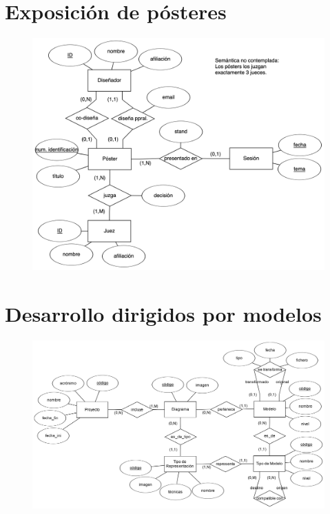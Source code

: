 \documentclass[a4paper]{article}
\begin{document}
\section{Exposición de pósteres}
\begin{figure}[H]
    \centering
    \includegraphics[width=\textwidth]{figs/ejercicio-12}
\end{figure}

\section{Desarrollo dirigidos por modelos}
\begin{figure}[H]
    \centering
    \includegraphics[width=\textwidth]{figs/ejercicio-13}
\end{figure}
\end{document}
